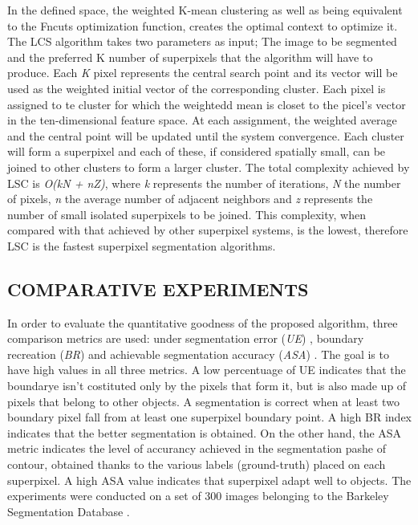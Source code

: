 In the defined space, the weighted K-mean clustering as well as being 
equivalent to the Fncuts optimization function, creates the optimal context to 
optimize it. The LCS algorithm takes two parameters as input; The image 
to be segmented and the preferred K number of superpixels that the 
algorithm will have to produce. Each \emph{K} pixel represents the central search point 
and its vector will be used as the weighted initial vector of the corresponding 
cluster. Each pixel is assigned to te cluster for which the weightedd mean 
is closet to the picel's vector in the ten-dimensional feature space. At each 
assignment, the weighted average and the central point will be updated until 
the system convergence. Each cluster will form a superpixel and each of 
these, if considered spatially small, can be joined to other clusters to form 
a larger cluster. The total complexity achieved by LSC is \emph{O(kN + nZ)}, where 
\emph{k} represents the number of iterations, \emph{N} the number of pixels, \emph{n} the average 
number of adjacent neighbors and \emph{z} represents the number of small 
isolated superpixels to be joined. This complexity, when compared with that 
achieved by other superpixel systems, is the lowest, therefore LSC is the 
fastest superpixel segmentation algorithms.

\subsection{COMPARATIVE EXPERIMENTS}
In order to evaluate the quantitative goodness of the proposed algorithm, 
three comparison metrics are used: under segmentation error (\emph{UE}) \cite{0781426514}, boundary 
recreation (\emph{BR}) and achievable segmentation accuracy (\emph{ASA}) \cite{0781426508}. The goal 
is to have high values in all three metrics. A low percentuage of UE indicates 
that the boundarye isn't costituted only by the pixels that form it, but is 
also made up of pixels that belong to other objects. A segmentation is correct 
when at least two boundary pixel fall from at least one superpixel boundary 
point. A high BR index indicates that the better segmentation is obtained. 
On the other hand, the ASA metric indicates the level of accurancy achieved 
in the segmentation pashe of contour, obtained thanks to the various labels 
(ground-truth) placed on each superpixel. A high ASA value indicates that 
superpixel adapt well to objects. The experiments were conducted on a set 
of 300 images belonging to the Barkeley Segmentation Database \cite{0781426515}.

